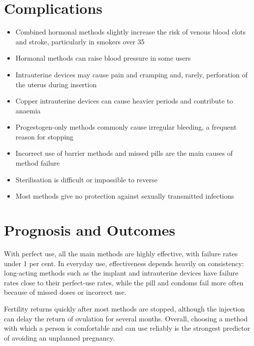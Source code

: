 \section*{Complications}
\begin{itemize}
    \item Combined hormonal methods slightly increase the risk of venous blood clots and stroke, particularly in smokers over 35
    \item Hormonal methods can raise blood pressure in some users
    \item Intrauterine devices may cause pain and cramping and, rarely, perforation of the uterus during insertion
    \item Copper intrauterine devices can cause heavier periods and contribute to anaemia
    \item Progestogen-only methods commonly cause irregular bleeding, a frequent reason for stopping
    \item Incorrect use of barrier methods and missed pills are the main causes of method failure
    \item Sterilisation is difficult or impossible to reverse
    \item Most methods give no protection against sexually transmitted infections
\end{itemize}

\section*{Prognosis and Outcomes}
With perfect use, all the main methods are highly effective, with failure rates under 1 per cent. In everyday use, effectiveness depends heavily on consistency: long-acting methods such as the implant and intrauterine devices have failure rates close to their perfect-use rates, while the pill and condoms fail more often because of missed doses or incorrect use.

Fertility returns quickly after most methods are stopped, although the injection can delay the return of ovulation for several months. Overall, choosing a method with which a person is comfortable and can use reliably is the strongest predictor of avoiding an unplanned pregnancy.

